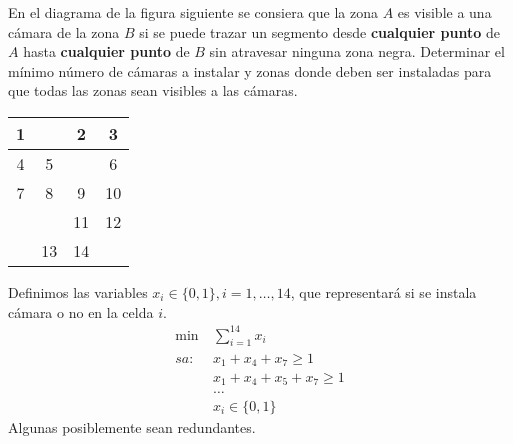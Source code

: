 \documentclass[twoside]{article}
\begin{document}
\newpage

\begin{ejercicio}{10}
En el diagrama de la figura siguiente se consiera que la zona $A$ es visible a una cámara de la zona $B$ si se puede trazar un segmento desde \textbf{cualquier punto} de $A$ hasta \textbf{cualquier punto} de $B$ sin atravesar ninguna zona negra. Determinar el mínimo número de cámaras a instalar y zonas donde deben ser instaladas para que todas las zonas sean visibles a las cámaras.

\begin{center}
\begin{tabular}{|c|c|c|c|}
\hline
1 & \cellcolor{black} & 2 & 3\\
\hline
4 & 5 & \cellcolor{black} & 6\\
\hline
7 & 8 & 9 & 10\\
\hline
\cellcolor{black} & \cellcolor{black}& 11 & 12\\
 \hline
 \cellcolor{black}& 13 & 14 & \cellcolor{black} \\
 \hline
\end{tabular}
\end{center}
\end{ejercicio}
\begin{solucion}
Definimos las variables $x_i\in\{0,1\}, i=1,\dots, 14$, que representará si se instala cámara o no en la celda $i$.
\begin{align*}
\min\ & \sum_{i=1}^{14} x_i\\
sa:\ & x_1+x_4+x_7\geq 1\\
& x_1 + x_4 +x_5 +x_7\geq 1\\
&\dots\\
&x_i\in\{0,1\}
\end{align*}
Algunas posiblemente sean redundantes.

\end{solucion}

\newpage
\end{document}
